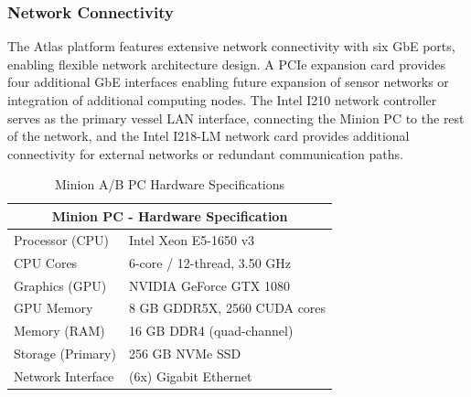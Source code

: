 \subsubsection{Network Connectivity}
The Atlas platform features extensive network connectivity with six \ac{GbE} ports, enabling flexible network architecture design. %
A PCIe expansion card provides four additional \ac{GbE} interfaces %
enabling future expansion of sensor networks or integration of additional computing nodes.
The Intel I210 network controller serves as the primary vessel LAN interface, connecting the Minion PC to the rest of the network, and the Intel I218-LM network card provides additional connectivity for external networks or redundant communication paths.


\begin{table}[htpb]
\centering
\caption{Minion A/B PC Hardware Specifications}
\begin{tabular}{ll}
\hline
\multicolumn{2}{c}{Minion PC - Hardware Specification} \\
\hline
\hline
Processor (CPU) & Intel Xeon E5-1650 v3 \\
CPU Cores & 6-core / 12-thread, 3.50 GHz \\
Graphics (GPU) & NVIDIA GeForce GTX 1080 \\
GPU Memory & 8 GB GDDR5X, 2560 CUDA cores \\
Memory (RAM) & 16 GB DDR4 (quad-channel) \\
Storage (Primary) & 256 GB NVMe SSD \\
Network Interface & (6x) Gigabit Ethernet \\%
\hline
\end{tabular}
\label{table:Minion_hardware}
\end{table}

